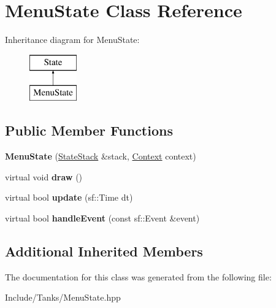 \hypertarget{class_menu_state}{}\section{Menu\+State Class Reference}
\label{class_menu_state}
Inheritance diagram for Menu\+State\+:\begin{figure}[H]
\begin{center}
\leavevmode
\includegraphics[height=2.000000cm]{class_menu_state}
\end{center}
\end{figure}
\subsection*{Public Member Functions}
\begin{DoxyCompactItemize}
\item 
\hypertarget{class_menu_state_a6e7034c57bf83f24aa8f4321d3d210a5}{}{\bfseries Menu\+State} (\hyperlink{class_state_stack}{State\+Stack} \&stack, \hyperlink{struct_state_1_1_context}{Context} context)\label{class_menu_state_a6e7034c57bf83f24aa8f4321d3d210a5}

\item 
\hypertarget{class_menu_state_a7214f8d8b7ecd282100d1ca1a1dc168f}{}virtual void {\bfseries draw} ()\label{class_menu_state_a7214f8d8b7ecd282100d1ca1a1dc168f}

\item 
\hypertarget{class_menu_state_a588a73443b2eca91edc895fe5a2a94ce}{}virtual bool {\bfseries update} (sf\+::\+Time dt)\label{class_menu_state_a588a73443b2eca91edc895fe5a2a94ce}

\item 
\hypertarget{class_menu_state_a985853550bfe9569b2e446f1b9ecb5af}{}virtual bool {\bfseries handle\+Event} (const sf\+::\+Event \&event)\label{class_menu_state_a985853550bfe9569b2e446f1b9ecb5af}

\end{DoxyCompactItemize}
\subsection*{Additional Inherited Members}


The documentation for this class was generated from the following file\+:\begin{DoxyCompactItemize}
\item 
Include/\+Tanks/Menu\+State.\+hpp\end{DoxyCompactItemize}
